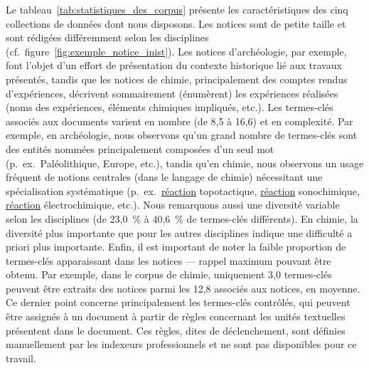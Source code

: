   Le tableau~\ref{tab:statistiques_des_corpus} présente les caractéristiques des
  cinq collections de données dont nous disposons. Les notices sont de petite
  taille et sont rédigées différemment selon les disciplines
  (cf.~figure~\ref{fig:exemple_notice_inist}). Les notices d'archéologie, par
  exemple, font l'objet d'un effort de présentation du contexte historique lié
  aux travaux présentés, tandis que les notices de chimie, principalement des
  comptes rendus d'expériences, décrivent sommairement (énumèrent) les
  expériences réalisées (noms des expériences, éléments chimiques impliqués,
  etc.). Les termes-clés associés aux documents varient en nombre (de 8,5 à
  16,6) et en complexité. Par exemple, en archéologie, nous observons qu'un
  grand nombre de termes-clés sont des entités nommées principalement composées
  d'un seul mot (p.~ex.~\og{}Paléolithique\fg{}, \og{}Europe\fg{}, etc.), tandis
  qu'en chimie, nous observons un usage fréquent de notions centrales (dans le
  langage de chimie) nécessitant une spécialisation systématique
  (p.~ex.~\og{}\underline{réaction} topotactique\fg{}, \og{}\underline{réaction}
  sonochimique\fg{}, \og{}\underline{réaction} électrochimique\fg{}, etc.).
  Nous remarquons aussi une diversité variable selon les disciplines (de 23,0~\%
  à 40,6~\% de termes-clés différents). En chimie, la diversité plus importante
  que pour les autres disciplines indique une difficulté a priori plus
  importante. Enfin, il est important de noter la faible proportion de
  termes-clés apparaissant dans les notices --- rappel maximum pouvant être
  obtenu. Par exemple, dans le corpus de chimie, uniquement 3,0 termes-clés
  peuvent être extraits des notices parmi les 12,8 associés aux notices, en
  moyenne. Ce dernier point concerne principalement les termes-clés contrôlés,
  qui peuvent être assignés à un document à partir de règles concernant les
  unités textuelles présentent dans le document. Ces règles, dites de
  déclenchement, sont définies manuellement par les indexeurs professionnels et
  ne sont pas disponibles pour ce travail.
